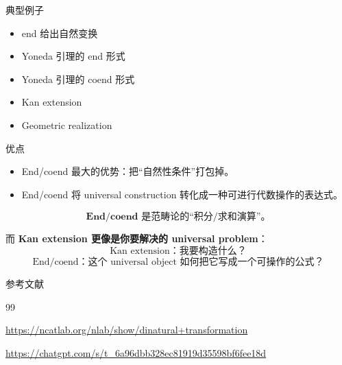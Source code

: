 \documentclass{beamer}
\begin{document}
\begin{frame}{典型例子}
\begin{itemize}
  \item end 给出自然变换
  \item Yoneda 引理的 end 形式
  \item Yoneda 引理的 coend 形式
  \item Kan extension
  \item Geometric realization
\end{itemize}
\end{frame}

\begin{frame}{优点}
\begin{itemize}
  \item End/coend 最大的优势：把“自然性条件”打包掉。
  \item End/coend 将 universal construction 转化成一种可进行代数操作的表达式。
\end{itemize}

$$
\boxed{
\textbf{End/coend 是范畴论的“积分/求和演算”。}
}
$$

而 \textbf{Kan extension 更像是你要解决的 universal problem}：
$$
\boxed{
\text{Kan extension：我要构造什么？}
}
$$
$$
\boxed{
\text{End/coend：这个 universal object 如何把它写成一个可操作的公式？}
}
$$
\end{frame}

\begin{frame}[allowframebreaks]{参考文献}
\begin{thebibliography}{99}

\url{https://ncatlab.org/nlab/show/dinatural+transformation}

\url{https://chatgpt.com/s/t_6a96dbb328ec81919d35598bf6fee18d}

\end{thebibliography}
\end{frame}
\end{document}
